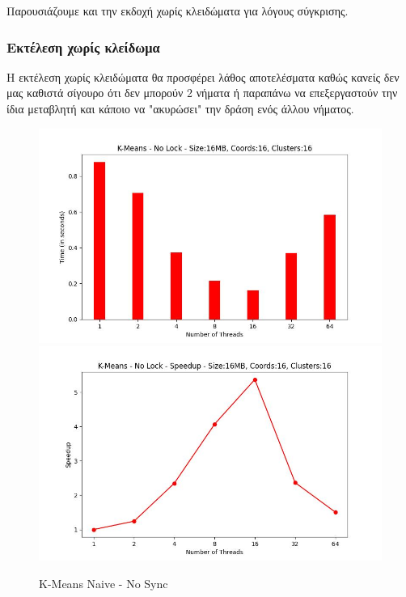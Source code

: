 \documentclass[../final_report.tex]{subfiles}
\begin{document}
Παρουσιάζουμε και την εκδοχή χωρίς κλειδώματα για λόγους σύγκρισης.

\subsubsection{Εκτέλεση χωρίς κλείδωμα}

Η εκτέλεση χωρίς κλειδώματα θα προσφέρει λάθος αποτελέσματα καθώς κανείς δεν μας
καθιστά σίγουρο ότι δεν μπορούν 2 νήματα ή παραπάνω να επεξεργαστούν την ίδια μεταβλητή και 
κάποιο να "ακυρώσει" την δράση ενός άλλου νήματος.

\begin{figure}[H]
    \centering
        \includegraphics[scale=0.4]{outFilesAffinityMouliko/plots/kmeans_locks_nosync.jpg}
        \includegraphics[scale=0.4]{outFilesAffinityMouliko/plots/kmeans_locks_nosync_speedup.jpg}
    \caption{K-Means Naive - No Sync}
    \label{fig:K-Means Naive - No Sync}
\end{figure}
\end{document}
